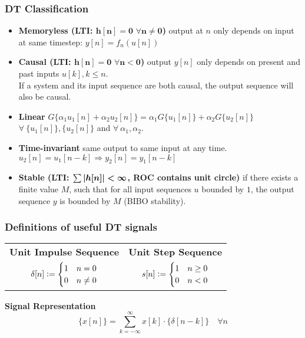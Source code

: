 \subsubsection{DT Classification}
    \begin{itemize}
        \item		{\bf Memoryless (LTI: $\boldsymbol{h[n] = 0 \,\, \forall n \neq 0}$)} output at $n$ only depends on input at same timestep: $y[n] = f_n(u[n])$
        \item		{\bf Causal (LTI: $\boldsymbol{ h[n] = 0 \,\, \forall n < 0}$)} output $y[n]$ only depends on present and past inputs $u[k], k \leq n$.\\
                    If a system and its input sequence are both causal, the output sequence will also be causal.
        \item		{\bf Linear} $G\{\alpha_1u_1[n] + \alpha_2u_2[n]\} = \alpha_1G\{u_1[n]\} + \alpha_2G\{u_2[n]\}$ $ \forall\ \{u_1[n]\}, \{u_2[n]\}$ and $\forall \ \alpha_1,\alpha_2$.
        \item		{\bf Time-invariant} same output to same input at any time.\\ ${u_2[n]} = {u_1[n-k]} \Rightarrow {y_2[n]} = {y_1[n-k]}$  %
        \item		{\bf Stable (LTI: $\boldsymbol{\sum \abs{h[n]} < \infty}$, ROC contains unit circle)} if there exists a finite value $M$, such that for all input sequences $u$ bounded by $1$, the output sequence $y$ is bounded by $M$ (BIBO stability).
    \end{itemize}
\subsubsection{Definitions of useful DT signals}
    \begin{center}
        \renewcommand{\tabcolsep}{10pt}
        \renewcommand{\arraystretch}{1.6}
        \begin{tabular}{cc}
            \bf Unit Impulse Sequence & \bf Unit Step Sequence \\
            $\delta[n] \vcentcolon= \begin{cases}1 & n = 0 \\ 0 & n \neq 0\end{cases}$ & $s[n] \vcentcolon= \begin{cases} 1 & n \geq 0 \\ 0 & n < 0 \end{cases}$\\
        \end{tabular}
    \end{center}
    \textbf{Signal Representation}
        $$
            \{x[n]\} = \sum\limits_{k=-\infty}^{\infty} x[k] \cdot \{\delta[n-k]\} \quad \forall n
        $$
